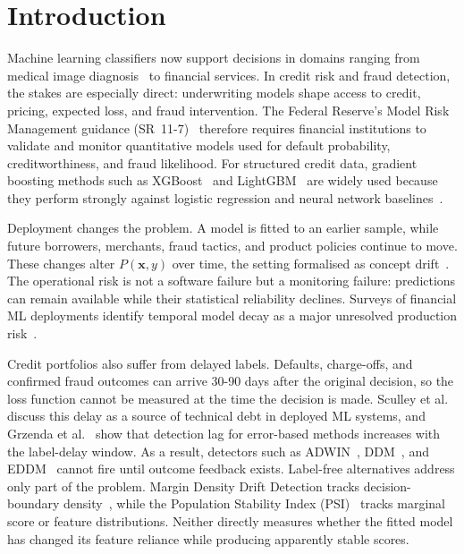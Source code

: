\documentclass[pdflatex,sn-mathphys-num]{sn-jnl}
\theoremstyle{thmstyleone}
\theoremstyle{thmstyletwo}
\theoremstyle{thmstylethree}
\begin{document}
\maketitle

\section{Introduction}\label{sec:intro}

Machine learning classifiers now support decisions in domains ranging from
medical image diagnosis~\cite{geetha2023skin} to financial services. In credit
risk and fraud detection, the stakes are especially direct: underwriting models
shape access to credit, pricing, expected loss, and fraud intervention. The
Federal Reserve's Model Risk Management guidance (SR~11-7)~\cite{sr117_2011}
therefore requires financial institutions to validate and monitor quantitative
models used for default probability, creditworthiness, and fraud likelihood.
For structured credit data, gradient boosting methods such as
XGBoost~\cite{chen2016xgboost} and LightGBM~\cite{ke2017lightgbm} are widely
used because they perform strongly against logistic regression and neural
network baselines~\cite{lessmann2015credit,shi2022credit}.

Deployment changes the problem. A model is fitted to an earlier sample, while
future borrowers, merchants, fraud tactics, and product policies continue to
move. These changes alter $P(\mathbf{x}, y)$ over time, the setting formalised
as concept drift~\cite{gama2014drift}. The operational risk is not a software
failure but a monitoring failure: predictions can remain available while their
statistical reliability declines. Surveys of financial ML deployments identify
temporal model decay as a major unresolved production
risk~\cite{hinder2024drift,shi2022credit}.

Credit portfolios also suffer from delayed labels. Defaults, charge-offs, and
confirmed fraud outcomes can arrive 30-90 days after the original decision,
so the loss function cannot be measured at the time the decision is made.
Sculley et al.~\cite{sculley2015debt} discuss this delay as a source of
technical debt in deployed ML systems, and Grzenda et
al.~\cite{grzenda2020delayed} show that detection lag for error-based methods
increases with the label-delay window. As a result, detectors such as
ADWIN~\cite{bifet2007adwin}, DDM~\cite{gama2004ddm}, and
EDDM~\cite{baena2006eddm} cannot fire until outcome feedback exists. Label-free
alternatives address only part of the problem. Margin Density Drift Detection
tracks decision-boundary density~\cite{sethi2015margin}, while the Population
Stability Index (PSI)~\cite{siddiqi2006scorecard} tracks marginal score or
feature distributions. Neither directly measures whether the fitted model has
changed its feature reliance while producing apparently stable scores.
\end{document}
